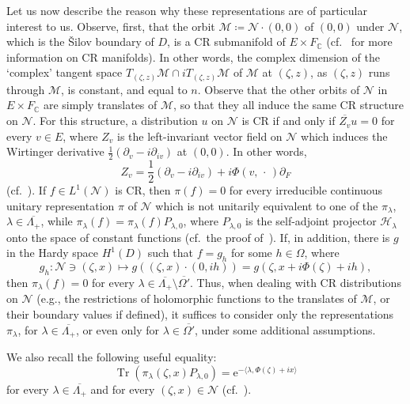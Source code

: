\documentclass[10.5pt,reqno]{amsart}
\DeclareMathOperator{\tr}{Tr}
\newcommand{\ee}{\mathrm{e}}
\newcommand{\C}{\mathds{C}}
\newcommand{\Hs}{\mathscr{H}}
\newcommand{\cM}{\mathcal{M}}
\newcommand{\Nc}{\mathcal{N}}
\begin{document}
Let us now describe the reason why these representations are of particular interest to us. Observe, first, that the orbit $\cM\coloneqq\Nc\cdot (0,0)$ of $(0,0)$ under $\Nc$, which is the \v Silov boundary of $D$, is a CR submanifold of $E\times F_\C$ (cf.~\cite{Boggess} for more information on CR manifolds). In other words, the complex dimension of the `complex' tangent space $T_{(\zeta,z)}\cM\cap i T_{(\zeta,z)}\cM$ of $\cM$ at $(\zeta,z)$, as $(\zeta,z)$ runs through $\cM$, is constant, and equal to $n$.
Observe that the other orbits of $\Nc$ in $E\times F_\C$ are simply translates of $\cM$, so that they all induce the same CR structure on $\Nc$. For this structure, a distribution $u$ on $\Nc$ is CR if and only if $\overline{Z_v} u=0$ for every $v\in E$, where $Z_v$ is the left-invariant vector field on $\Nc$ which induces the Wirtinger derivative $\frac 1 2 (\partial_v -i \partial_{i v})$ at $(0,0)$. In other words,
\[
Z_v=\frac 1 2 (\partial_v -i \partial_{i v})+ i \Phi(v,\,\cdot\,)\partial_F
\]
(cf.~\cite[Subsection 2.2]{PWS}).
If $f\in L^1(\Nc)$ is CR, then $\pi(f)=0$ for every irreducible continuous unitary representation $\pi$ of $\Nc$ which is not unitarily equivalent to one of the $\pi_\lambda$, $\lambda\in \overline{\Lambda_+}$, while $\pi_\lambda(f)=\pi_\lambda(f) P_{\lambda,0}$, where $P_{\lambda,0}$ is the self-adjoint projector  $\Hs_\lambda$ onto the space of constant functions (cf.~the proof of~\cite[Proposition 2.6]{PWS}). If, in addition, there is $g$ in the Hardy space $ H^1(D)$ such that $f=g_h$ for some $h\in \Omega$, where 
\[
g_h\colon \Nc\ni (\zeta,x)\mapsto g((\zeta,x)\cdot (0,i h))=g(\zeta,x+i\Phi(\zeta)+i h),
\] 
then $\pi_\lambda(f)=0$ for every $\lambda\in \overline{\Lambda_+}\setminus \overline{\Omega'}$. Thus, when dealing with CR distributions on $\Nc$ (e.g., the restrictions of holomorphic functions to the translates of $\cM$, or their boundary values if defined), it suffices to consider only the representations $\pi_\lambda$, for $\lambda\in \overline{\Lambda_+}$, or even only for $\lambda\in \overline{\Omega'}$, under some additional assumptions.

We also recall the following useful equality:
\begin{equation}\label{eq:2}
	\tr(\pi_\lambda(\zeta,x) P_{\lambda,0})=\ee^{-\langle \lambda, \Phi(\zeta)+i x\rangle}
\end{equation}
for every $\lambda\in \overline{\Lambda_+}$ and for every $(\zeta,x)\in \Nc$ (cf.~\cite[Proposition 2.3]{PWS}).
\end{document}
